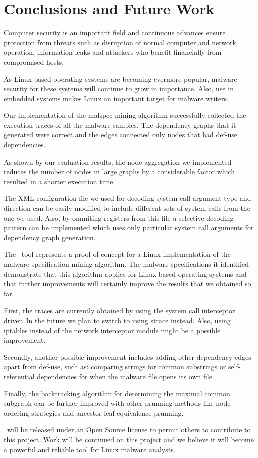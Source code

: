 \chapter{Conclusions and Future Work}
\label{chapter:sixth}

Computer security is an important field and continuous advances ensure protection from threats such as disruption of normal computer and network operation, information leaks and attackers who benefit financially from compromised hosts.

As Linux based operating systems are becoming evermore popular, malware security for these systems will continue to grow in importance. Also, use in embedded systems makes Linux an important target for malware writers.

Our implementation of the malspec mining algorithm successfully collected the execution traces of all the malware samples. The dependency graphs that it generated were correct and the edges connected only nodes that had def-use dependencies.

As shown by our evaluation results, the node aggregation we implemented reduces the number of nodes in large graphs by a considerable factor which resulted in a shorter execution time.

The XML configuration file we used for decoding system call argument type and direction can be easily modified to include different sets of system calls from the one we used. Also, by ommiting registers from this file a selective decoding pattern can be implemented which uses only particular system call arguments for dependency graph generation.

The \textbf{\project}\ tool represents a proof of concept for a Linux implementation of the malware specification mining algorithm. The malware specifications it identified demonstrate that this algorithm applies for Linux based operating systems and that further improvements will certainly improve the results that we obtained so far.

First, the traces are currently obtained by using the system call interceptor driver. In the future we plan to switch to using strace instead. Also, using iptables instead of the network interceptor module might be a possible improvement.

Secondly, another possible improvement includes adding other dependency edges apart from def-use, such as: comparing strings for common substrings or self-referential dependencies for when the malware file opens its own file.

Finally, the backtracking algorithm for determining the maximal common subgraph can be further improved with other prunning methods like node ordering strategies and ancestor-leaf equivalence prunning.

\textbf{\project}\ will be released under an Open Source license to permit others to contribute to this project. Work will be continued on this project and we believe it will become a powerful and reliable tool for Linux malware analysts.
